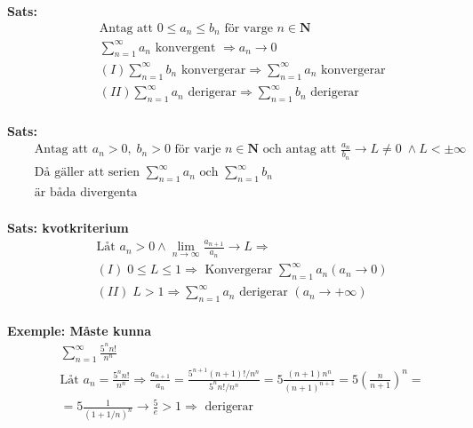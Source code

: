 \textbf{Sats: }
\begin{align*}
  &\quad  \text{Antag att } 0 \leq a_n \leq b_n \text{ för varge } n\in \mathbf{N} \\
  &\quad  \displaystyle\sum_{n=1}^{\infty}a_n \text{ konvergent } \Rightarrow a_n\to{0} \\
  &\quad  (I) \displaystyle\sum_{n=1}^{\infty}b_n \text{ konvergerar}
  \Rightarrow \displaystyle\sum_{n=1}^{\infty}a_n \text{ konvergerar} \\
  &\quad  (II) \displaystyle\sum_{n=1}^{\infty}a_n \text{ derigerar}
  \Rightarrow \displaystyle\sum_{n=1}^{\infty}b_n \text{ derigerar} \\
\end{align*}


\textbf{Sats: }
\begin{align*}
  &\quad  \text{Antag att } a_n >0, \; b_n >0 \text{ för varje } n \in \mathbf{N} \text{ och antag att } 
  \frac{a_n}{b_n}\to L \neq 0 \; \land L < \pm\infty\\
  &\quad  \text{Då gäller att serien } \displaystyle\sum_{n=1}^{\infty}a_n \text{ och }
  \displaystyle\sum_{n=1}^{\infty}b_n \\
  &\quad  \text{är båda divergenta} \\
\end{align*}

\textbf{Sats: kvotkriterium}
\begin{align*}
  &\quad  \text{Låt } a_n>0 \land \lim_{n\to{\infty}}\frac{a_{n+1}}{a_n}\to L \Rightarrow \\
  &\quad  (I) \; 0 \leq L \leq 1 \Rightarrow \text{ Konvergerar } \displaystyle\sum_{n=1}^{\infty}a_n
  (a_n \to 0) \\
  &\quad  (II) \; L>1 \Rightarrow \displaystyle\sum_{n=1}^{\infty}a_n \text{ derigerar }
  (a_n \to +\infty) \\
\end{align*}

\textbf{Exemple: Måste kunna}
\begin{align*}
  &\quad  \displaystyle\sum_{n=1}^{\infty}\frac{5^n n!}{n^n} \\
  &\quad  \text{Låt } a_n = \frac{5^n n!}{n^n} \Rightarrow \frac{a_{n+1}}{a_n} =
  \frac{5^{n+1}(n+1)!/n^n}{5^n n!/n^n} = 5 \frac{(n+1)n^n}{{(n+1)}^{n+1}} = 5 {(\frac{n}{n+1})}^n = \\
  &\quad  = 5 \frac{1}{{(1+1/n)}^n} \to \frac{5}{e} > 1 \Rightarrow \text{ derigerar}\\
\end{align*}



